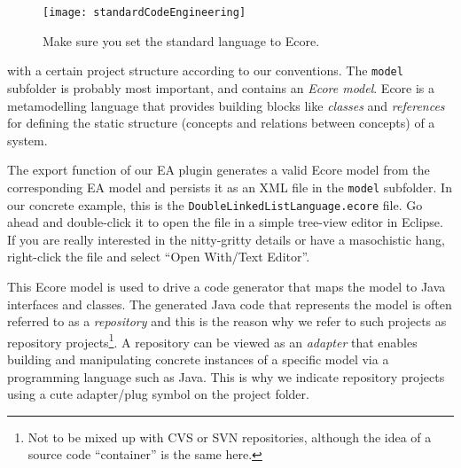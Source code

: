 \newpage
\visHeader

\begin{figure}[htbp]
    \centering
    \texttt{[image: standardCodeEngineering]}
    \caption{Make sure you set the standard language to Ecore.}
    \label{fig_standardSCEEA}
 \end{figure}

with a certain project structure according to our conventions.  
The  \texttt{model} subfolder is probably most important, and contains an  \emph{Ecore model}.  
Ecore is a metamodelling language that provides building  blocks like \emph{classes} and \emph{references} for defining the  static structure (concepts and relations between concepts) of a system.  



The  export function of our EA plugin generates a valid Ecore model from the  corresponding EA model and persists it as an XML file in the \texttt{model}  subfolder.  
In our concrete example, this is the \texttt{DoubleLinkedListLanguage.ecore} file.  
Go ahead and double-click it to open the file in a simple tree-view editor in Eclipse.  
If you are really interested in the nitty-gritty details or have a masochistic hang, right-click the file and select ``Open With/Text Editor''.


This Ecore model is used to drive a code generator that maps the model to Java interfaces and classes.  
The generated Java code that represents the model is often referred to as a \emph{repository} and this is the reason why we refer to such projects as repository projects\footnote{Not to be mixed up with CVS or SVN repositories, although the idea of a source code ``container'' is the same here.}. 
A repository can be viewed as an \emph{adapter} that enables building and manipulating concrete instances of a specific model via a programming language such as Java.  
This is why we indicate repository projects using a cute adapter/plug symbol on the project folder.  